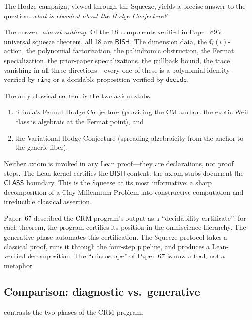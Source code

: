 \documentclass[11pt]{article}
\theoremstyle{plain}
\theoremstyle{definition}
\theoremstyle{remark}
\newcommand{\QQ}{\mathbb{Q}}
\newcommand{\BISH}{\mathsf{BISH}}
\newcommand{\CLASS}{\mathsf{CLASS}}
\begin{document}
The Hodge campaign, viewed through the Squeeze, yields a precise
answer to the question: \emph{what is classical about the Hodge
Conjecture?}

The answer: \emph{almost nothing}.  Of the 18 components verified
in Paper~89's universal squeeze theorem, all 18 are $\BISH$.  The
dimension data, the $\QQ(i)$-action, the polynomial factorization,
the palindromic obstruction, the Fermat specialization, the
prior-paper specializations, the pullback bound, the trace
vanishing in all three directions---every one of these is a
polynomial identity verified by \texttt{ring} or a decidable
proposition verified by \texttt{decide}.

The only classical content is the two axiom stubs:
\begin{enumerate}[label=(\roman*)]
\item Shioda's Fermat Hodge Conjecture (providing the CM anchor:
  the exotic Weil class is algebraic at the Fermat point), and
\item the Variational Hodge Conjecture (spreading algebraicity
  from the anchor to the generic fiber).
\end{enumerate}

Neither axiom is invoked in any Lean proof---they are declarations,
not proof steps.  The Lean kernel certifies the $\BISH$ content;
the axiom stubs document the $\CLASS$ boundary.  This is the
Squeeze at its most informative: a sharp decomposition of a Clay
Millennium Problem into constructive computation and irreducible
classical assertion.

Paper~67 described the CRM program's output as a ``decidability
certificate'': for each theorem, the program certifies its position
in the omniscience hierarchy.  The generative phase automates this
certification.  The Squeeze protocol takes a classical proof, runs
it through the four-step pipeline, and produces a Lean-verified
decomposition.  The ``microscope'' of Paper~67 is now a tool, not
a metaphor.

\subsection{Comparison: diagnostic vs.\ generative}

 contrasts the two phases of the
CRM program.
\end{document}
